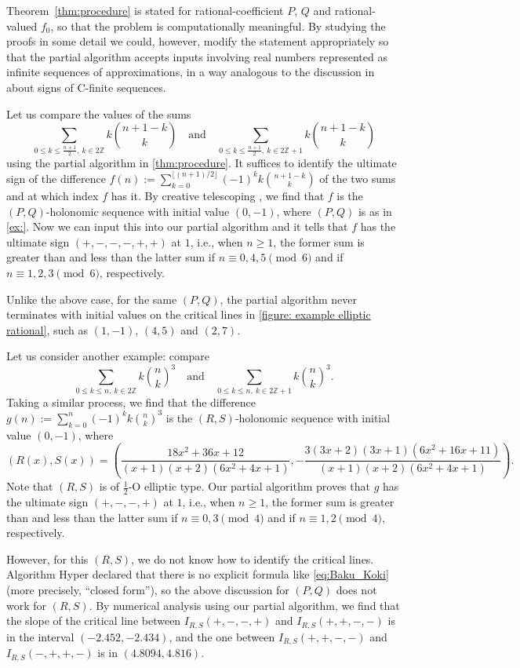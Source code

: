 \documentclass[a4paper,UKenglish,cleveref,autoref,thm-restate]{lipics-v2021}
\newcommand{\Z}{\mathbb{Z}}
\begin{document}
Theorem~\ref{thm:procedure} is stated for  
rational-coefficient $P$, $Q$ and rational-valued $f _0$, 
so that the problem is computationally meaningful. 
By studying the proofs in some detail 
we could, however, modify the statement appropriately 
so that the partial algorithm accepts inputs involving real numbers
represented as infinite sequences of approximations, 
in a way analogous to the discussion in \cite{Neu21}
about signs of C-finite sequences. 

\begin{example}
Let us compare the values of the sums 
\[
\sum_{0 \leq k \leq \frac{n+1}2 , \ k \in 2\Z} k \binom{n+1-k}{k} 
\quad \text{and} \quad 
\sum_{0 \leq k \leq \frac{n+1}2 , \ k \in 2\Z+1} k \binom{n+1-k}{k}
\]
using the partial algorithm in \cref{thm:procedure}. It suffices to identify the ultimate sign of the difference $f(n) := \sum_{k=0}^{\lfloor (n+1)/2\rfloor} (-1)^k k \binom{n+1-k}{k}$ of the two sums and at which index $f$ has it. By creative telescoping \cite[Chapter 6]{PWZ96}, we find that $f$ is the $(P, Q)$-holonomic sequence with initial value $(0, -1)$, where $(P, Q)$ is as in \cref{ex:}. Now we can input this into our partial algorithm and it tells that $f$ has the ultimate sign $(+, -, -, -, +, +)$ at $1$, i.e., when $n \geq 1$, the former sum is greater than and less than the latter sum if $n \equiv 0, 4, 5 \pmod{6}$ and if $n \equiv 1, 2, 3 \pmod{6}$, respectively. 

Unlike the above case, for the same $(P, Q)$, the partial algorithm never terminates with initial values on the critical lines in \cref{figure: example elliptic rational}, such as $(1, -1)$, $(4, 5)$ and $(2, 7)$. 


Let us consider another example: compare 
\[
\sum_{0 \leq k \leq n , \ k \in 2\Z} k \binom{n}{k}^3
\quad \text{and} \quad 
\sum_{0 \leq k \leq n , \ k \in 2\Z+1} k \binom{n}{k}^3. 
\]
Taking a similar process, we find that the difference $g(n) := \sum_{k=0}^n (-1)^k k \binom{n}{k}^3$ is the $(R, S)$-holonomic sequence with initial value $(0, -1)$, where
\[
(R(x), S(x)) = \left( \frac{18x^2 + 36 x + 12}{(x+1)(x+2)(6x^2+4x+1)}, -\frac{3(3x+2)(3x+1)(6x^2+16x+11)}{(x+1)(x+2)(6x^2+4x+1)} \right). 
\]
Note that $(R, S)$ is of $\frac12$-O elliptic type. Our partial algorithm proves that $g$ has the ultimate sign $(+, -, -, +)$ at $1$, i.e., when $n \geq 1$, the former sum is greater than and less than the latter sum if $n \equiv 0, 3 \pmod{4}$ and if $n \equiv 1, 2 \pmod{4}$, respectively. 

However, for this $(R, S)$, we do not know how to identify the critical lines. 
Algorithm Hyper \cite[Chapter 8]{PWZ96} declared that there is no explicit formula like \eqref{eq:Baku_Koki} (more precisely, ``closed form''), so the above discussion for $(P, Q)$ does not work for $(R, S)$. 
By numerical analysis using our partial algorithm, we find that the slope of the critical line between $I_{R, S}(+, -, -, +)$ and $I_{R, S}(+, +, -, -)$ is in the interval $(-2.452, -2.434)$, and the one between $I_{R, S}(+, +, -, -)$ and $I_{R, S}(-, +, +, -)$ is in $(4.8094, 4.816)$. 
\end{example}
\end{document}
